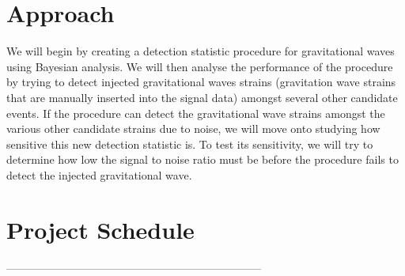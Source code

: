 \documentclass{article}
\begin{document}
 
 \section{Approach}
 We will begin by creating a detection statistic procedure for gravitational waves using Bayesian analysis. We will then analyse the performance of the procedure by trying to detect injected gravitational waves strains (gravitation wave strains that are manually inserted into the signal data) amongst several other candidate events. If the procedure can detect the gravitational wave strains amongst the various other candidate strains due to noise, we will move onto studying how sensitive this new detection statistic is. To test its sensitivity, we will try to determine how low the signal to noise ratio must be before the procedure fails to detect the injected gravitational wave.
 
 
 
 \section{Project Schedule}
 
 
---------------------------------------------------------------------
 
 
 
 
\end{document}
